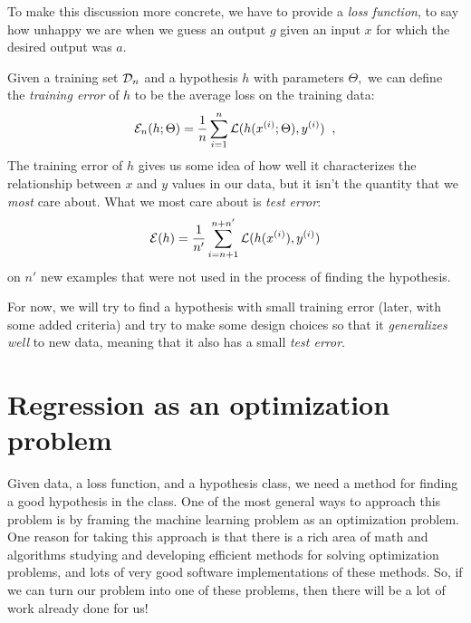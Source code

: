 To make this discussion more concrete, we have to provide a {\em loss
    function}, to say how unhappy we are when we guess an output $g$
given an input $x$ for which the desired output was $a$.

Given a training set ${\cal D}_n$ and a hypothesis $h$ with parameters $\Theta,$ we can define the
  {\em training error} of $h$ to be the average loss on the training data:
\begin{eqnarray}\label{erm}
  \mathcal{E}_n(h; \Theta) =  \frac{1}{n}\sum_{i = 1}^n
  \mathcal{L}(h(x^{(i)};\Theta), y^{(i)})\;\;,
\end{eqnarray}
The training error of $h$ gives us some idea of how well it
characterizes the relationship between $x$ and $y$ values in our data,
but it isn't the quantity that we {\em most} care about. What we most care about is
  {\em test error}:
\begin{eqnarray*}
  \mathcal{E}(h) = \frac{1}{n'}\sum_{i = n + 1}^{n + n'}
  \mathcal{L}(h(x^{(i)}), y^{(i)})
\end{eqnarray*}
on $n'$ new examples that were not used in the process of finding the
hypothesis.

For now, we will try to find a hypothesis with small training error
(later, with some added criteria) and try to make some design choices
so that it {\em{generalizes well}}
to new data, meaning that it also has a small {\em test error}.

\section{Regression as an optimization problem}

\label{sec-reg_optim}

Given data, a loss function, and a hypothesis class, we
need a method for finding a good hypothesis in the class.  One of the
most general ways to approach this problem is by framing the machine
learning problem as an optimization problem.  One reason for taking
this approach is that there is a rich area of math and algorithms
studying and developing efficient methods for solving optimization
problems, and lots of very good software implementations of these
methods.  So, if we can turn our problem into one of these problems,
then there will be a lot of work already done for us!

